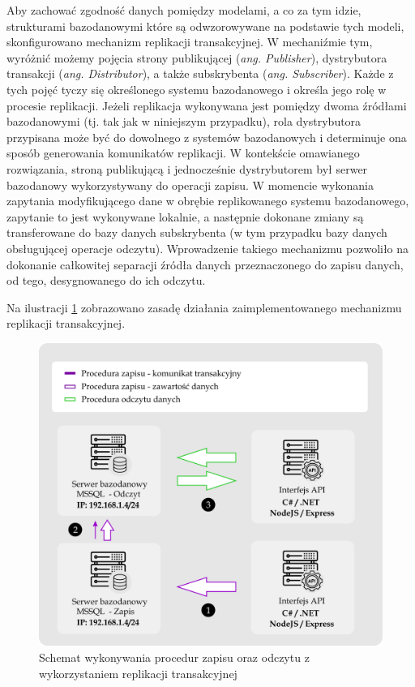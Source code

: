 Aby zachować zgodność danych pomiędzy modelami, a co za tym idzie, strukturami bazodanowymi które są odwzorowywane na podstawie tych modeli, skonfigurowano mechanizm replikacji transakcyjnej. W mechaniźmie tym, wyróżnić możemy pojęcia strony publikującej (\textit{ang. Publisher}), dystrybutora transakcji  (\textit{ang. Distributor}), a także subskrybenta (\textit{ang. Subscriber}). Każde z tych pojęć tyczy się określonego systemu bazodanowego i określa jego rolę w procesie replikacji. Jeżeli replikacja wykonywana jest pomiędzy dwoma źródłami bazodanowymi (tj. tak jak w niniejszym przypadku), rola dystrybutora przypisana może być do dowolnego z systemów bazodanowych i determinuje ona sposób generowania komunikatów replikacji. W kontekście omawianego rozwiązania, stroną publikującą i jednocześnie dystrybutorem był serwer bazodanowy wykorzystywany do operacji zapisu. W momencie wykonania zapytania modyfikującego dane w obrębie replikowanego systemu bazodanowego, zapytanie to jest wykonywane lokalnie, a następnie dokonane zmiany są transferowane do bazy danych subskrybenta (w tym przypadku bazy danych obsługującej operacje odczytu). Wprowadzenie takiego mechanizmu pozwoliło na dokonanie całkowitej separacji źródła danych przeznaczonego do zapisu danych, od tego, desygnowanego do ich odczytu.

Na ilustracji \ref{fig:jak-dziala-replikacja} zobrazowano zasadę działania zaimplementowanego mechanizmu replikacji transakcyjnej.

\begin{figure}[ht]
    \centering
     \includegraphics[width=\linewidth]{rys04/jak_dziala_transakcja.png}
    \caption{Schemat wykonywania procedur zapisu oraz odczytu z wykorzystaniem replikacji transakcyjnej}
    \label{fig:jak-dziala-replikacja}
\end{figure}

